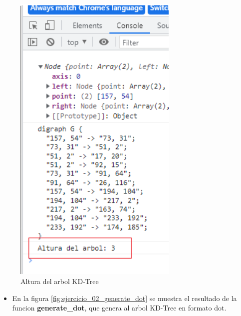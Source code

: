\documentclass{article}
\begin{document}
\begin{figure}[h!]
	\centering
	\includegraphics[width=0.7\textwidth]{img/ejercicio_02_getheight.png}
	\caption{Altura del arbol KD-Tree}
	\label{fig:ejercicio_02_getheight}
\end{figure}

\begin{itemize}
	\item En la figura \ref{fig:ejercicio_02_generate_dot} se muestra el resultado de la funcion \textbf{generate\_dot}, que genera al arbol KD-Tree en formato dot.
\end{itemize}
\end{document}
